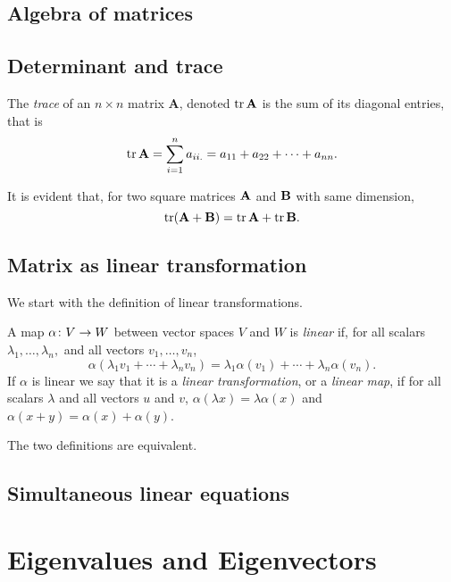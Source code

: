 \documentclass[main.tex]{subfiles}
\begin{document}
		\subsection{Algebra of matrices}
		
		\subsection{Determinant and trace}
			\begin{theorem}
				The \textit{trace}  of an $n \times n$ matrix $\mathbf{A}$, denoted $\operatorname{tr} \mathbf{A}$ is the sum of its diagonal entries, that is
				\begin{equation*}
					\operatorname{tr} \mathbf{A} = \sum_{i = 1}^{n} a_{ii.} = a_{11} + a_{22} + \cdots + a_{nn}.
				\end{equation*}
			\end{theorem}
			\begin{theorem}
				It is evident that, for two square matrices $\mathbf{A}$ and $\mathbf{B}$ with same dimension,
				\begin{equation*}
				\operatorname{tr}(\mathbf{A + B}) = \operatorname{tr}\mathbf{A} + \operatorname{tr}\mathbf{B}.
				\end{equation*}
			\end{theorem}
		
			
			
		\subsection{Matrix as linear transformation}
			We start with the definition of linear transformations.
			\begin{definition}
				A map $\alpha \colon V \rightarrow W$ between vector spaces $V$ and $W$ is \textit{linear} if, for all scalars $\lambda_1, \ldots, \lambda_n,$ and all vectors $v_1, \ldots, v_n$,
				\begin{equation*}
					\alpha\left(\lambda_1v_1 + \cdots + \lambda_n v_n\right) = \lambda_1\alpha(v_1) + \cdots + \lambda_n\alpha(v_n).
				\end{equation*}
			If $\alpha$ is linear we say that it is a \textit{linear transformation}, or a \textit{linear map}, if for all scalars $\lambda$ and all vectors $u$ and $v$, $\alpha(\lambda x) = \lambda\alpha(x)$ and $\alpha( x + y) = \alpha (x) + \alpha(y)$.
			\end{definition}
		The two definitions are equivalent.
		
		\subsection{Simultaneous linear equations}
		
		\section{Eigenvalues and Eigenvectors}
		
\end{document}
